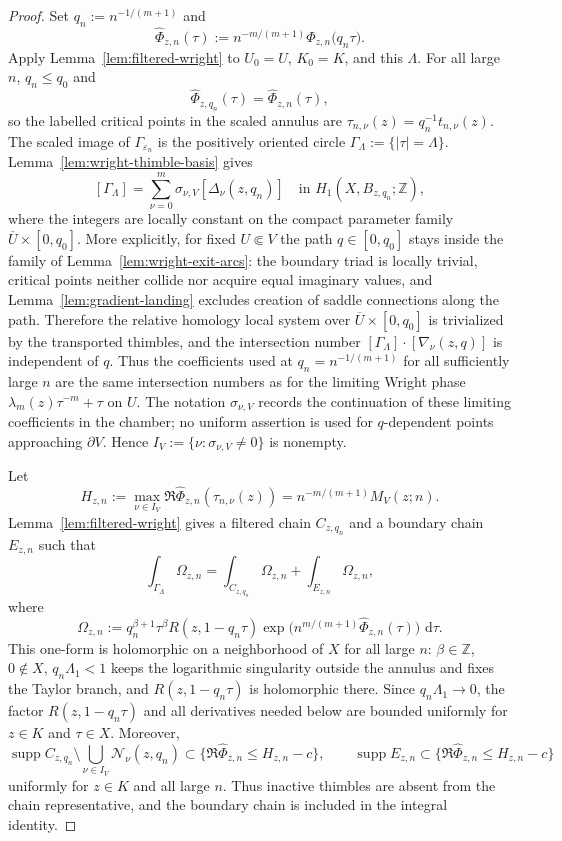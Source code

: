 \documentclass[reqno]{article}
\theoremstyle{definition}
\theoremstyle{remark}
\theoremstyle{plain}
\newcommand{\dd}{\,\mathrm d}
\begin{document}
\begin{proof}
Set $q_n:=n^{-1/(m+1)}$ and
$$\widehat\Phi_{z,n}(\tau):=n^{-m/(m+1)}\Phi_{z,n}\!\bigl(q_n\tau\bigr).$$
Apply Lemma~\ref{lem:filtered-wright} to $U_0=U$, $K_0=K$, and this $\Lambda$. For all large $n$, $q_n\le q_0$ and
$$\widehat\Phi_{z,q_n}(\tau)=\widehat\Phi_{z,n}(\tau),$$
so the labelled critical points in the scaled annulus are $\tau_{n,\nu}(z)=q_n^{-1}t_{n,\nu}(z)$. The scaled image of $\Gamma_{\varepsilon_n}$ is the positively oriented circle $\Gamma_\Lambda:=\{|\tau|=\Lambda\}$. Lemma~\ref{lem:wright-thimble-basis} gives
$$[\Gamma_\Lambda]=\sum_{\nu=0}^m\sigma_{\nu,V}[\Delta_\nu(z,q_n)]
\quad\text{in }H_1(X,B_{z,q_n};\mathbb Z),$$
where the integers are locally constant on the compact parameter family $\overline U\times[0,q_0]$. More explicitly, for fixed $U\Subset V$ the path $q\in[0,q_0]$ stays inside the family of Lemma~\ref{lem:wright-exit-arcs}: the boundary triad is locally trivial, critical points neither collide nor acquire equal imaginary values, and Lemma~\ref{lem:gradient-landing} excludes creation of saddle connections along the path. Therefore the relative homology local system over $\overline U\times[0,q_0]$ is trivialized by the transported thimbles, and the intersection number $[\Gamma_\Lambda]\cdot[\nabla_\nu(z,q)]$ is independent of $q$. Thus the coefficients used at $q_n=n^{-1/(m+1)}$ for all sufficiently large $n$ are the same intersection numbers as for the limiting Wright phase $\lambda_m(z)\tau^{-m}+\tau$ on $U$. The notation $\sigma_{\nu,V}$ records the continuation of these limiting coefficients in the chamber; no uniform assertion is used for $q$-dependent points approaching $\partial V$. Hence $I_V:=\{\nu:\sigma_{\nu,V}\ne0\}$ is nonempty.

Let
$$H_{z,n}:=\max_{\nu\in I_V}\Re\widehat\Phi_{z,n}(\tau_{n,\nu}(z))=n^{-m/(m+1)}M_V(z;n).$$
Lemma~\ref{lem:filtered-wright} gives a filtered chain $C_{z,q_n}$ and a boundary chain $E_{z,n}$ such that
$$\int_{\Gamma_\Lambda}\Omega_{z,n}=\int_{C_{z,q_n}}\Omega_{z,n}+\int_{E_{z,n}}\Omega_{z,n},$$
where
$$\Omega_{z,n}:=q_n^{\beta+1}\tau^\beta R(z,1-q_n\tau)
\exp\!\bigl(n^{m/(m+1)}\widehat\Phi_{z,n}(\tau)\bigr)\,\dd\tau.$$
This one-form is holomorphic on a neighborhood of $X$ for all large $n$: $\beta\in\mathbb Z$, $0\notin X$, $q_n\Lambda_1<1$ keeps the logarithmic singularity outside the annulus and fixes the Taylor branch, and $R(z,1-q_n\tau)$ is holomorphic there. Since $q_n\Lambda_1\to0$, the factor $R(z,1-q_n\tau)$ and all derivatives needed below are bounded uniformly for $z\in K$ and $\tau\in X$. Moreover,
$$\operatorname{supp}C_{z,q_n}\setminus\bigcup_{\nu\in I_V}\mathcal N_\nu(z,q_n)
\subset\{\Re\widehat\Phi_{z,n}\le H_{z,n}-c\},
\qquad
\operatorname{supp}E_{z,n}\subset\{\Re\widehat\Phi_{z,n}\le H_{z,n}-c\}$$
uniformly for $z\in K$ and all large $n$. Thus inactive thimbles are absent from the chain representative, and the boundary chain is included in the integral identity.


\end{proof}
\end{document}
